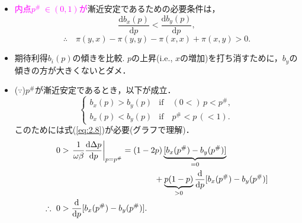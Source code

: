 \documentclass[uplatex,12pt,dvipdfmx,xcolor=svgnames]{beamer}
\newcommand{\bibun}{\mathrm{d}}
\begin{document}
\begin{frame}[t]{\secIII}
\begin{itemize}
%	
%	
%
%
%
	\vspace{5mm}
	\item \textcolor{magenta}{内点$p^{\#} \ \in(0, 1)$が}漸近安定であるための必要条件は，
		\begin{equation*}
			\frac{\bibun b_x(p)}{\bibun p} < \frac{\bibun b_y(p)}{\bibun p},
		\end{equation*}
		\begin{equation}
			\therefore\quad
			\pi(y,x) -\pi(y,y) -\pi(x,x) +\pi(x,y)>0.
			\tag{2.8}
			\label{eq:2.8}
		\end{equation}
	\item 期待利得$b_i(p)$の傾きを比較.
		$p$の上昇(i.e., $x$の増加)を打ち消すために，$b_y$の傾きの方が大きくないとダメ．
	\item ($\because$)\quad $p^{\#}$が漸近安定であるとき，以下が成立．
		\begin{equation*}
			\left\{
			\begin{array}{ll}
				b_x(p) > b_y(p) 
				& \text{if}\quad (0<)\, p < p^{\#}, \\
				b_x(p) < b_y(p)
				& \text{if}\quad p^{\#} < p \,(<1).
			\end{array}
			\right.
		\end{equation*}
		このためには式(\ref{eq:2.8})が必要(グラフで理解)．
		\begin{align*}
			0&> \left.\frac{1}{\omega\beta}
			\frac{\bibun \Delta p}{\bibun p}\right|_{p=p^{\#}}
			= (1-2p)
			\underbrace{[b_x(p^{\#})-b_y(p^{\#})]}_{=0} \\
			&\hspace{40mm}
			+\underbrace{p(1-p)}_{>0}
			\frac{\bibun}{\bibun p}[b_x(p^{\#})-b_y(p^{\#})] \\
			\therefore\ 0&>
			\frac{\bibun}{\bibun p}[b_x(p^{\#})-b_y(p^{\#})].
		\end{align*}
\end{itemize}


\end{frame}

\newcommand{\secIV}{進化的な安定性と社会的結果}
\end{document}
